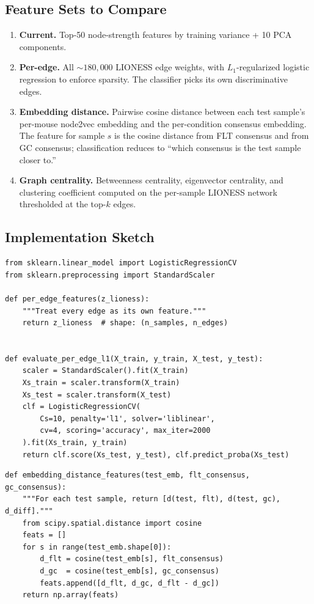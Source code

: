 \documentclass[11pt]{article}
\begin{document}
\subsection{Feature Sets to Compare}

\begin{enumerate}[leftmargin=*]
\item \textbf{Current.} Top-50 node-strength features by training variance + 10 PCA components.
\item \textbf{Per-edge.} All $\sim 180{,}000$ LIONESS edge weights, with $L_1$-regularized logistic regression to enforce sparsity. The classifier picks its own discriminative edges.
\item \textbf{Embedding distance.} Pairwise cosine distance between each test sample's per-mouse node2vec embedding and the per-condition consensus embedding. The feature for sample $s$ is the cosine distance from FLT consensus and from GC consensus; classification reduces to ``which consensus is the test sample closer to.''
\item \textbf{Graph centrality.} Betweenness centrality, eigenvector centrality, and clustering coefficient computed on the per-sample LIONESS network thresholded at the top-$k$ edges.
\end{enumerate}

\subsection{Implementation Sketch}

\begin{lstlisting}[style=pythonstyle,caption={Per-edge feature set with L1 logistic regression.}]
from sklearn.linear_model import LogisticRegressionCV
from sklearn.preprocessing import StandardScaler

def per_edge_features(z_lioness):
    """Treat every edge as its own feature."""
    return z_lioness  # shape: (n_samples, n_edges)


def evaluate_per_edge_l1(X_train, y_train, X_test, y_test):
    scaler = StandardScaler().fit(X_train)
    Xs_train = scaler.transform(X_train)
    Xs_test = scaler.transform(X_test)
    clf = LogisticRegressionCV(
        Cs=10, penalty='l1', solver='liblinear',
        cv=4, scoring='accuracy', max_iter=2000
    ).fit(Xs_train, y_train)
    return clf.score(Xs_test, y_test), clf.predict_proba(Xs_test)
\end{lstlisting}

\begin{lstlisting}[style=pythonstyle,caption={Embedding-distance feature.}]
def embedding_distance_features(test_emb, flt_consensus, gc_consensus):
    """For each test sample, return [d(test, flt), d(test, gc), d_diff]."""
    from scipy.spatial.distance import cosine
    feats = []
    for s in range(test_emb.shape[0]):
        d_flt = cosine(test_emb[s], flt_consensus)
        d_gc  = cosine(test_emb[s], gc_consensus)
        feats.append([d_flt, d_gc, d_flt - d_gc])
    return np.array(feats)
\end{lstlisting}
\end{document}

